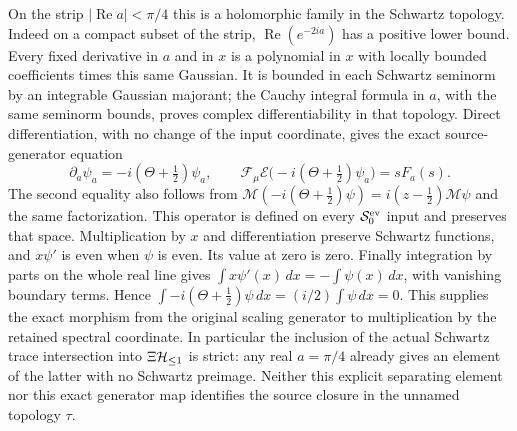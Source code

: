 On the strip $|\operatorname{Re}a|<\pi/4$ this is a holomorphic
family in the Schwartz topology. Indeed on a compact subset of
the strip, $\operatorname{Re}(e^{-2ia})$ has a positive lower
bound. Every fixed derivative in $a$ and in $x$ is a polynomial
in $x$ with locally bounded coefficients times this same Gaussian.
It is bounded in each Schwartz seminorm by an integrable Gaussian
majorant; the Cauchy integral formula in $a$, with the same
seminorm bounds, proves complex differentiability in that topology.
Direct differentiation, with no change of the input coordinate,
gives the exact source-generator equation
\begin{equation}\label{eq:cq-exponential-source-generator}
 \partial_a\psi_a=-i(\Theta+\tfrac12)\psi_a,\qquad
 \mathcal F_\mu\mathcal E\bigl(-i(\Theta+\tfrac12)\psi_a\bigr)
                                      =sF_a(s).
\end{equation}
The second equality also follows from
$\mathcal M(-i(\Theta+\tfrac12)\psi)
=i(z-\tfrac12)\mathcal M\psi$ and the same factorization.
This operator is defined on every $\mathcal S_0^{\rm ev}$ input
and preserves that space. Multiplication by $x$ and differentiation
preserve Schwartz functions, and $x\psi'$ is even when $\psi$ is even.
Its value at zero is zero. Finally integration by parts on the
whole real line gives $\int x\psi'(x)\,dx=-\int\psi(x)\,dx$,
with vanishing boundary terms. Hence
$\int-i(\Theta+\tfrac12)\psi\,dx=(i/2)\int\psi\,dx=0$.
This supplies the exact morphism from the original scaling
generator to multiplication by the retained spectral coordinate.
In particular the inclusion of the actual Schwartz trace
intersection into $\Xi\mathcal H_{\leq 1}$ is strict: any real $a=\pi/4$
already gives an element of the latter with no Schwartz preimage.
Neither this explicit separating element nor this exact generator
map identifies the source closure in the unnamed topology $\tau$.

